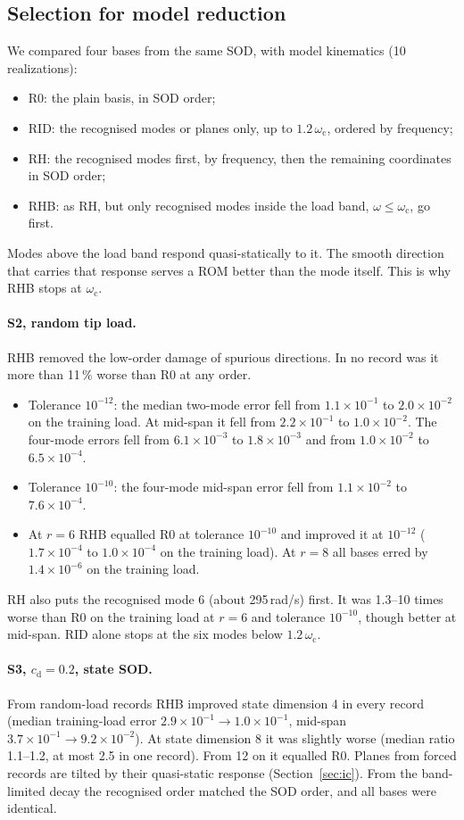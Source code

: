 \documentclass[preprint,12pt]{elsarticle}
\begin{document}
\subsection{Selection for model reduction}\label{sec:romsel}
We compared four bases from the same SOD, with model kinematics (10 realizations):
\begin{itemize}
\item R0: the plain basis, in SOD order;
\item RID: the recognised modes or planes only, up to $1.2\,\omega_{\mathrm c}$, ordered by frequency;
\item RH: the recognised modes first, by frequency, then the remaining coordinates in SOD order;
\item RHB: as RH, but only recognised modes inside the load band, $\omega\le\omega_{\mathrm c}$, go first.
\end{itemize}
Modes above the load band respond quasi-statically to it. The smooth direction that carries that response serves a ROM better than the mode itself. This is why RHB stops at $\omega_{\mathrm c}$.
\paragraph{S2, random tip load.} RHB removed the low-order damage of spurious directions. In no record was it more than 11\,\% worse than R0 at any order.
\begin{itemize}
\item Tolerance $10^{-12}$: the median two-mode error fell from $1.1\times10^{-1}$ to $2.0\times10^{-2}$ on the training load. At mid-span it fell from $2.2\times10^{-1}$ to $1.0\times10^{-2}$. The four-mode errors fell from $6.1\times10^{-3}$ to $1.8\times10^{-3}$ and from $1.0\times10^{-2}$ to $6.5\times10^{-4}$.
\item Tolerance $10^{-10}$: the four-mode mid-span error fell from $1.1\times10^{-2}$ to $7.6\times10^{-4}$.
\item At $r=6$ RHB equalled R0 at tolerance $10^{-10}$ and improved it at $10^{-12}$ ($1.7\times10^{-4}$ to $1.0\times10^{-4}$ on the training load). At $r=8$ all bases erred by $1.4\times10^{-6}$ on the training load.
\end{itemize}
RH also puts the recognised mode 6 (about 295\,rad/s) first. It was 1.3--10 times worse than R0 on the training load at $r=6$ and tolerance $10^{-10}$, though better at mid-span. RID alone stops at the six modes below $1.2\,\omega_{\mathrm c}$.
\paragraph{S3, $c_{\mathrm d}=0.2$, state SOD.} From random-load records RHB improved state dimension 4 in every record (median training-load error $2.9\times10^{-1}\to1.0\times10^{-1}$, mid-span $3.7\times10^{-1}\to9.2\times10^{-2}$). At state dimension 8 it was slightly worse (median ratio 1.1--1.2, at most 2.5 in one record). From 12 on it equalled R0. Planes from forced records are tilted by their quasi-static response (Section~\ref{sec:ic}). From the band-limited decay the recognised order matched the SOD order, and all bases were identical.
\end{document}
